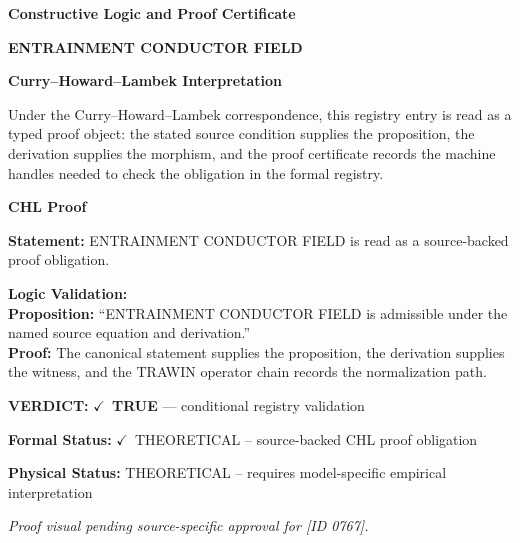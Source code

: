 \clearpage
\begingroup\tzpsupportsetup
\noindent\textbf{\fontsize{10.8pt}{12.8pt}\selectfont [ID 0767] Constructive Logic and Proof Certificate}\par
\noindent\textbf{\fontsize{10pt}{12pt}\selectfont ENTRAINMENT CONDUCTOR FIELD}\par
\vspace{0.45em}
\begingroup
\footnotesize
\setlength{\parskip}{0.22em}
\setlength{\parindent}{0pt}
\noindent\textbf{Curry--Howard--Lambek Interpretation}\par
Under the Curry--Howard--Lambek correspondence, this registry entry is read as a typed proof
object: the stated source condition supplies the proposition, the derivation supplies the
morphism, and the proof certificate records the machine handles needed to check the obligation
in the formal registry.

\vspace{0.45em}
\noindent\textbf{CHL Proof}\par
\textbf{Statement:} ENTRAINMENT CONDUCTOR FIELD is read as a source-backed proof obligation.

\textbf{Logic Validation:}\\
\textbf{Proposition:} ``ENTRAINMENT CONDUCTOR FIELD is admissible under the named source equation and derivation.''\\
\textbf{Proof:} The canonical statement supplies the proposition, the derivation supplies the witness, and the TRAWIN operator chain records the normalization path.

\textbf{VERDICT:} \ensuremath{\checkmark}\ \textbf{TRUE} --- conditional registry validation

\textbf{Formal Status:} \ensuremath{\checkmark}\ THEORETICAL -- source-backed CHL proof obligation

\textbf{Physical Status:} THEORETICAL -- requires model-specific empirical interpretation
\par\vspace{0.45em}
\par
\vfill
\begingroup\footnotesize\itshape
Proof visual pending source-specific approval for [ID 0767].
\par\endgroup
\vfill
\endgroup
\endgroup
